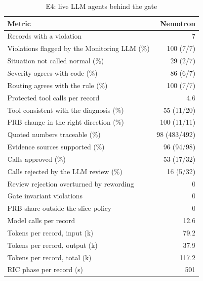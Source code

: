 \begin{table}[!t]
\centering
\caption{E4: live LLM agents behind the gate}\label{tab:live}
\footnotesize
\setlength{\tabcolsep}{3pt}
\begin{tabular}{@{}lr@{}}
\toprule
Metric & Nemotron \\
\midrule
Records with a violation & 7 \\
Violations flagged by the Monitoring LLM (\%) & 100 (7/7) \\
Situation not called normal (\%) & 29 (2/7) \\
Severity agrees with code (\%) & 86 (6/7) \\
Routing agrees with the rule (\%) & 100 (7/7) \\
Protected tool calls per record & 4.6 \\
Tool consistent with the diagnosis (\%) & 55 (11/20) \\
PRB change in the right direction (\%) & 100 (11/11) \\
Quoted numbers traceable (\%) & 98 (483/492) \\
Evidence sources supported (\%) & 96 (94/98) \\
Calls approved (\%) & 53 (17/32) \\
Calls rejected by the LLM review (\%) & 16 (5/32) \\
Review rejection overturned by rewording & 0 \\
Gate invariant violations & 0 \\
PRB share outside the slice policy & 0 \\
Model calls per record & 12.6 \\
Tokens per record, input (k) & 79.2 \\
Tokens per record, output (k) & 37.9 \\
Tokens per record, total (k) & 117.2 \\
RIC phase per record (s) & 501 \\
\bottomrule
\end{tabular}
\end{table}
